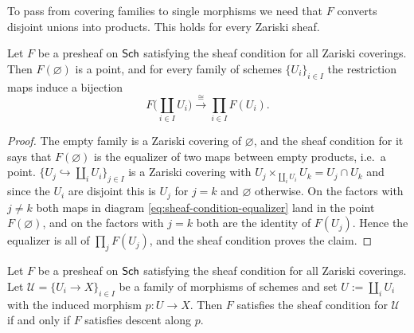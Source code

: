 To pass from covering families to single morphisms we need that $F$ converts disjoint unions into products. This holds for every Zariski sheaf.

\begin{lemma}\label{lem:sheaf-preserves-coproducts}
	Let $F$ be a presheaf on $\mathsf{Sch}$ satisfying the sheaf condition for all Zariski coverings. Then $F(\varnothing)$ is a point, and for every family of schemes $\{U_i\}_{i\in I}$ the restriction maps induce a bijection
	\[
	F\Big(\coprod_{i\in I}U_i\Big)\xrightarrow{\ \cong\ }\prod_{i\in I}F(U_i).
	\]
\end{lemma}

\begin{proof}
	The empty family is a Zariski covering of $\varnothing$, and the sheaf condition for it says that $F(\varnothing)$ is the equalizer of two maps between empty products, i.e.\ a point. $\{U_j\hookrightarrow\coprod_iU_i\}_{j\in I}$ is a Zariski covering with $U_j\times_{\coprod_iU_i}U_k=U_j\cap U_k$ and since the $U_i$ are disjoint this is $U_j$ for $j=k$ and $\varnothing$ otherwise. On the factors with $j\ne k$ both maps in diagram \eqref{eq:sheaf-condition-equalizer} land in the point $F(\varnothing)$, and on the factors with $j=k$ both are the identity of $F(U_j)$. Hence the equalizer is all of $\prod_jF(U_j)$, and the sheaf condition proves the claim.
\end{proof}

\begin{proposition}\label{lem:sheaf-single-cover}
	Let $F$ be a presheaf on $\mathsf{Sch}$ satisfying the sheaf condition for all Zariski coverings. Let $\mathcal{U}=\{U_i\to X\}_{i\in I}$ be a family of morphisms of schemes and set $U:=\coprod_iU_i$ with the induced morphism $p:U\to X$. Then $F$ satisfies the sheaf condition for $\mathcal{U}$ if and only if $F$ satisfies descent along $p$.
\end{proposition}

